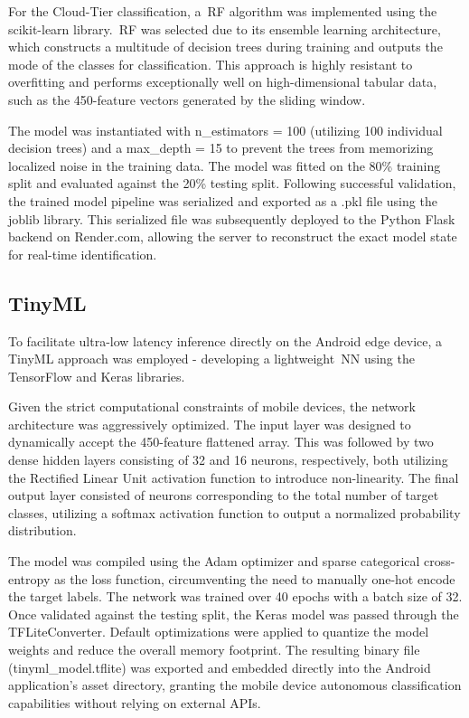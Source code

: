 For the Cloud-Tier classification, a~\gls{RF} algorithm was implemented using the scikit-learn library.~\gls{RF} was selected due to its ensemble learning architecture, which constructs a multitude of decision trees during training and outputs the mode 
of the classes for classification. This approach is highly resistant to overfitting and performs exceptionally well on high-dimensional tabular data, such as the 450-feature vectors generated by the sliding window.

The model was instantiated with n\_estimators = 100 (utilizing 100 individual decision trees) and a max\_depth = 15 to prevent the trees from memorizing localized noise in the training data. The model was fitted on the 80\% training split and evaluated against 
the 20\% testing split. Following successful validation, the trained model pipeline was serialized and exported as a .pkl file using the joblib library. This serialized file was subsequently deployed to the Python Flask backend on Render.com, allowing the server 
to reconstruct the exact model state for real-time identification.

\subsection{Tiny\gls{ML}}
\label{ssec:ml_tml}

To facilitate ultra-low latency inference directly on the Android edge device, a Tiny\gls{ML} approach was employed - developing a lightweight~\gls{NN} using the TensorFlow and Keras libraries.

Given the strict computational constraints of mobile devices, the network architecture was aggressively optimized. The input layer was designed to dynamically accept the 450-feature flattened array. This was followed by two dense hidden layers consisting of 32 
and 16 neurons, respectively, both utilizing the Rectified Linear Unit activation function to introduce non-linearity. The final output layer consisted of neurons corresponding to the total number of target classes, utilizing a softmax activation 
function to output a normalized probability distribution.

The model was compiled using the Adam optimizer and sparse categorical cross-entropy as the loss function, circumventing the need to manually one-hot encode the target labels. The network was trained over 40 epochs with a batch size of 32. Once validated against 
the testing split, the Keras model was passed through the TFLiteConverter. Default optimizations were applied to quantize the model weights and reduce the overall memory footprint. The resulting binary file (tinyml\_model.tflite) was exported and embedded directly 
into the Android application's asset directory, granting the mobile device autonomous classification capabilities without relying on external APIs.



